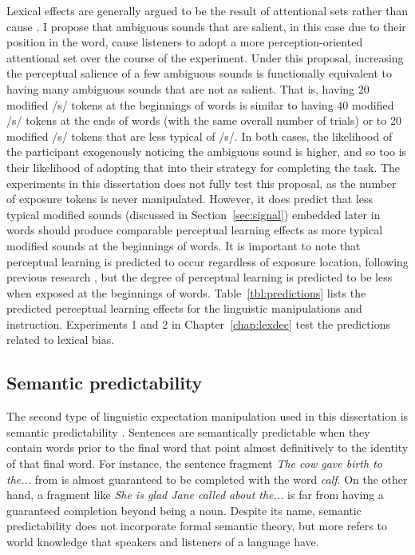 Lexical effects are generally argued to be the result of attentional sets rather than cause \citep{Cutler1987, Pitt2012}.
I propose that ambiguous sounds that are salient, in this case due to their position in the word, cause listeners to adopt a more perception-oriented attentional set over the course of the experiment.
Under this proposal, increasing the perceptual salience of a few ambiguous sounds is functionally equivalent to having many ambiguous sounds that are not as salient.
That is, having 20 modified /s/ tokens at the beginnings of words is similar to having 40 modified /s/ tokens at the ends of words (with the same overall number of trials) or to 20 modified /s/ tokens that are less typical of /s/.
In both cases, the likelihood of the participant exogenously noticing the ambiguous sound is higher, and so too is their likelihood of adopting that into their strategy for completing the task.
The experiments in this dissertation does not fully test this proposal, as the number of exposure tokens is never manipulated.
However, it does predict that less typical modified sounds (discussed in Section~\ref{sec:signal}) embedded later in words should produce comparable perceptual learning effects as more typical modified sounds at the beginnings of words.
It is important to note that perceptual learning is predicted to occur regardless of exposure location, following previous research \citep{Norris2003,Kraljic2005, Kraljic2008, Kraljic2008,Clare2014}, but the degree of perceptual learning is predicted to be less when exposed at the beginnings of words.
Table~\ref{tbl:predictions} lists the predicted perceptual learning effects for the linguistic manipulations and instruction.
Experiments 1 and 2  in Chapter~\ref{chap:lexdec} test the predictions related to lexical bias.

\subsection{Semantic predictability}
\label{sec:semanticpredictability}

The second type of linguistic expectation manipulation used in this dissertation is semantic predictability \citep{Kalikow1977}.
Sentences are semantically predictable when they contain words prior to the final word that point almost definitively to the identity of that final word.  
For instance, the sentence fragment \emph{The cow gave birth to the...} from \citet{Kalikow1977} is almost guaranteed to be completed with the word \emph{calf}.  
On the other hand, a fragment like \emph{She is glad Jane called about the...} is far from having a guaranteed completion beyond being a noun.
Despite its name, semantic predictability does not incorporate formal semantic theory, but more refers to world knowledge that speakers and listeners of a language have.

